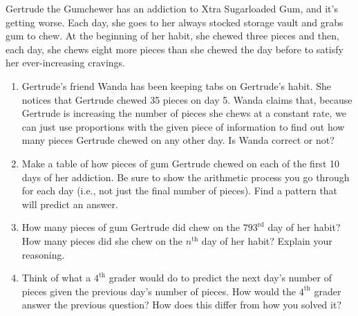\documentclass[justified,openany,nofonts]{tufte-book}
\begin{document}
\begin{prob}
Gertrude the Gumchewer has an addiction to Xtra Sugarloaded Gum, and it's getting worse.  Each day, she goes to her always stocked storage vault and grabs gum to chew.  At the beginning of her habit, she chewed three pieces and then, each day, she chews eight more pieces than she chewed the day before to satisfy her ever-increasing cravings.
\begin{enumerate}
\item Gertrude's friend Wanda has been keeping tabs on Gertrude's habit.  She notices that Gertrude chewed 35 pieces on day 5.  Wanda claims that, because Gertrude is increasing the number of pieces she chews at a constant rate, we can just use proportions with the given piece of information to find out how many pieces Gertrude chewed on any other day.  Is Wanda correct or not?

\item Make a table of how pieces of gum Gertrude chewed on each of the first 10 days of her addiction.  Be sure to show the arithmetic process you go through for each day (i.e., not just the final number of pieces).  Find a pattern that will predict an answer.  

\item How many pieces of gum Gertrude did chew on the $793^\mathrm{rd}$ day of her habit?  How many pieces did she chew on the $n^\mathrm{th}$ day of her habit?  Explain your reasoning.  

\item Think of what a $4^\mathrm{th}$ grader would do to predict the next day's number of pieces given the previous day's number of pieces.  How would the $4^\mathrm{th}$ grader answer the previous question?  How does this differ from how you solved it?


\end{enumerate}
\end{prob}
\end{document}
